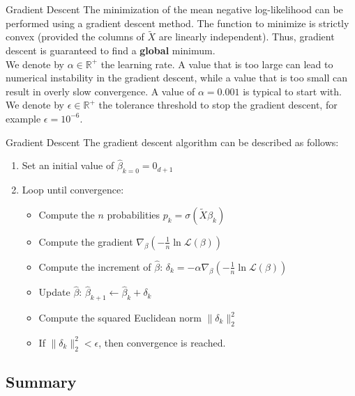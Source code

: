\begin{frame}{Gradient Descent}
	The minimization of the mean negative log-likelihood can be performed using a gradient descent method. The function to minimize is strictly convex (provided the columns of $\tilde{X}$ are linearly independent). Thus, gradient descent is guaranteed to find a \textbf{global} minimum. \\
	\vspace{0.5cm}
	We denote by $\alpha \in \mathbb{R}^+$ the learning rate. A value that is too large can lead to numerical instability in the gradient descent, while a value that is too small can result in overly slow convergence. A value of $\alpha = 0.001$ is typical to start with. \\
	\vspace{0.5cm}
	We denote by $\epsilon \in \mathbb{R}^+$ the tolerance threshold to stop the gradient descent, for example $\epsilon = 10^{-6}$.
\end{frame}

\begin{frame}{Gradient Descent}
	The gradient descent algorithm can be described as follows:
	\begin{enumerate}
		\item Set an initial value of $\hat{\beta}_{k=0} = 0_{d+1}$
		\item Loop until convergence:
		\begin{itemize}
			\item Compute the $n$ probabilities $p_k = \sigma(\tilde{X} \beta_{k})$
			\item Compute the gradient $\nabla_{\beta}\left(- \frac{1}{n} \ln{\mathcal{L}(\beta)}\right)$
			\item Compute the increment of $\hat{\beta}$: $\delta_k = - \alpha \nabla_{\beta}\left(- \frac{1}{n} \ln{\mathcal{L}(\beta)}\right)$
			\item Update $\hat{\beta}$: $\hat{\beta}_{k+1} \leftarrow \hat{\beta}_{k} + \delta_k$
			\item Compute the squared Euclidean norm $\|\delta_k \|_2^2$
			\item If $\|\delta_k \|_2^2 < \epsilon$, then convergence is reached.
		\end{itemize}
	\end{enumerate}
\end{frame}

\subsection[Summary]{Summary}

